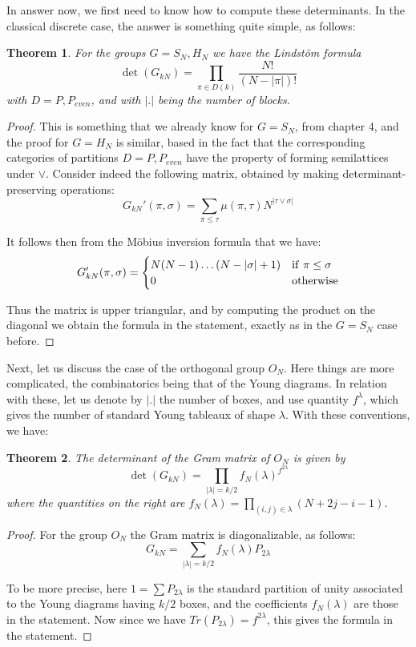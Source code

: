 \documentclass[12pt]{amsbook}
\newtheorem{theorem}{Theorem}[chapter]
\begin{document}
In answer now, we first need to know how to compute these determinants. In the classical discrete case, the answer is something quite simple, as follows:

\begin{theorem}
For the groups $G=S_N,H_N$ we have the Lindst\"om formula
$$\det(G_{kN})=\prod_{\pi\in D(k)}\frac{N!}{(N-|\pi|)!}$$
with $D=P,P_{even}$, and with $|.|$ being the number of blocks.
\end{theorem}

\begin{proof}
This is something that we already know for $G=S_N$, from chapter 4, and the proof for $G=H_N$ is similar, based in the fact that the corresponding categories of partitions $D=P,P_{even}$ have the property of forming semilattices under $\vee$. Consider indeed the following matrix, obtained by making determinant-preserving operations:
$$G_{kN}'(\pi,\sigma)=\sum_{\pi\leq\tau}\mu(\pi,\tau)N^{|\tau\vee\sigma|}$$

It follows then from the M\"obius inversion formula that we have:
$$G_{kN}'(\pi,\sigma)=
\begin{cases}
N(N-1)\ldots(N-|\sigma|+1)&{\rm if}\ \pi\leq\sigma\\
0&{\rm otherwise}
\end{cases}$$

Thus the matrix is upper triangular, and by computing the product on the diagonal we obtain the formula in the statement, exactly as in the $G=S_N$ case before.
\end{proof}

Next, let us discuss the case of the orthogonal group $O_N$. Here things are more complicated, the combinatorics being that of the Young diagrams. In relation with these, let us denote by $|.|$ the number of boxes, and use quantity $f^\lambda$, which gives the number of standard Young tableaux of shape $\lambda$. With these conventions, we have:


\begin{theorem}
The determinant of the Gram matrix of $O_N$ is given by
$$\det(G_{kN})=\prod_{|\lambda|=k/2}f_N(\lambda)^{f^{2\lambda}}$$
where the quantities on the right are $f_N(\lambda)=\prod_{(i,j)\in\lambda}(N+2j-i-1)$.
\end{theorem}

\begin{proof}
For the group $O_N$ the Gram matrix is diagonalizable, as follows:
$$G_{kN}=\sum_{|\lambda|=k/2}f_N(\lambda)P_{2\lambda}$$

To be more precise, here $1=\sum P_{2\lambda}$ is the standard partition of unity associated to the Young diagrams having $k/2$ boxes, and the coefficients $f_N(\lambda)$ are those in the statement. Now since we have $Tr(P_{2\lambda})=f^{2\lambda}$, this gives the formula in the statement.
\end{proof}
\end{document}
